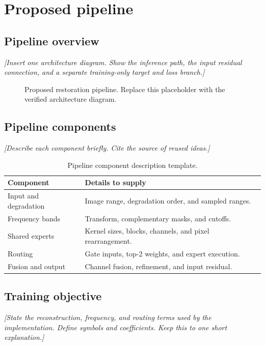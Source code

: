 \chapter{Proposed pipeline}
\label{ch:pipeline}

\section{Pipeline overview}
\textit{[Insert one architecture diagram. Show the inference path, the input residual connection, and a separate training-only target and loss branch.]}

\begin{figure}[ht]
\centering
{}
\caption{Proposed restoration pipeline. Replace this placeholder with the verified architecture diagram.}
\label{fig:pipeline}
\end{figure}

\section{Pipeline components}
\textit{[Describe each component briefly. Cite the source of reused ideas.]}
\begin{singlespace}
\begin{table}[ht]
\centering
\caption{Pipeline component description template.}
\begin{tabular}{p{}p{}}
\toprule
Component & Details to supply \\
\midrule
Input and degradation & Image range, degradation order, and sampled ranges. \\
Frequency bands & Transform, complementary masks, and cutoffs. \\
Shared experts & Kernel sizes, blocks, channels, and pixel rearrangement. \\
Routing & Gate inputs, top-2 weights, and expert execution. \\
Fusion and output & Channel fusion, refinement, and input residual. \\
\bottomrule
\end{tabular}
\end{table}
\end{singlespace}

\section{Training objective}
\textit{[State the reconstruction, frequency, and routing terms used by the implementation. Define symbols and coefficients. Keep this to one short explanation.]}
